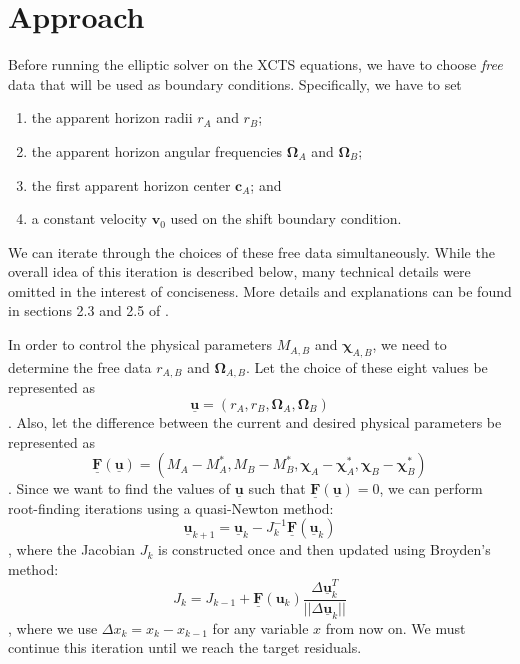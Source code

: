 \documentclass{../document}
\renewcommand{\v}[1]{\boldsymbol{#1}}
\newcommand{\vv}[1]{\underline{\boldsymbol{#1}}}
\begin{document}
	\section{Approach}

	Before running the elliptic solver on the XCTS equations, we have to choose \textit{free} data that will be used as boundary conditions. Specifically, we have to set
	\begin{enumerate}
		\item the apparent horizon radii $r_A$ and $r_B$;
		\item the apparent horizon angular frequencies $\v \Omega_A$ and $\v \Omega_B$;
		\item the first apparent horizon center $\v c_A$; and
		\item a constant velocity $\v v_0$ used on the shift boundary condition.
	\end{enumerate}

	We can iterate through the choices of these free data simultaneously. While the overall idea of this iteration is described below, many technical details were omitted in the interest of conciseness. More details and explanations can be found in sections 2.3 and 2.5 of \cite{Serguei}.

	In order to control the physical parameters $M_{A,B}$ and $\v\chi_{A,B}$, we need to determine the free data $r_{A,B}$ and $\v\Omega_{A,B}$. Let the choice of these eight values be represented as
	\begin{equation}
		\vv u = (r_A, r_B, \v\Omega_A, \v\Omega_B)
	\end{equation}
	\cite{Serguei}. Also, let the difference between the current and desired physical parameters be represented as
	\begin{equation}
		\vv F(\vv u) = (M_A - M_A^*, M_B - M_B^*, \v \chi_A - \v \chi_A^*, \v \chi_B - \v \chi_B^*)
	\end{equation}
	 \cite{Serguei}. Since we want to find the values of $\vv u$ such that $\vv F(\vv u) = 0$, we can perform root-finding iterations using a quasi-Newton method:
	\begin{equation}
		\vv u_{k+1} = \vv u_k - J_k^{-1} \vv F(\vv u_k)
	\end{equation}
	\cite{Serguei}, where the Jacobian $J_k$ is constructed once and then updated using Broyden's method:
	\begin{equation}
		J_k = J_{k-1} + \vv F(\v u_k) \frac{\Delta \vv u_k^T}{||\Delta \vv u_k||}
	\end{equation}
	\cite{Serguei}, where we use $\Delta x_k = x_k - x_{k-1}$ for any variable $x$ from now on. We must continue this iteration until we reach the target residuals.
\end{document}
